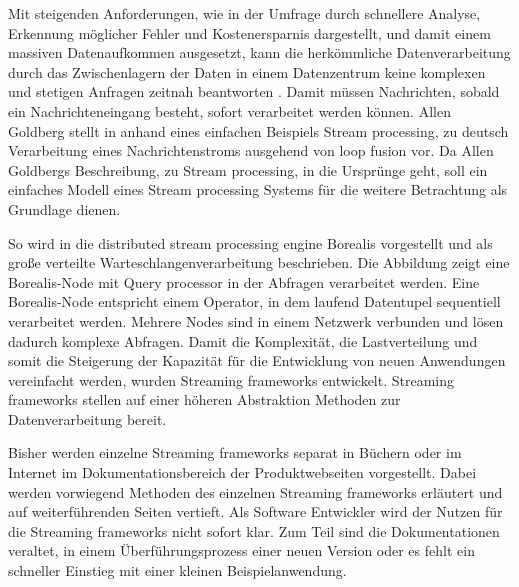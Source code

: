 Mit steigenden Anforderungen, wie in der Umfrage  durch schnellere Analyse, Erkennung möglicher Fehler und Kostenersparnis dargestellt, und damit einem massiven Datenaufkommen ausgesetzt, kann die herkömmliche Datenverarbeitung  durch das Zwischenlagern der Daten in einem Datenzentrum keine komplexen und stetigen Anfragen zeitnah beantworten . Damit müssen Nachrichten, sobald ein Nachrichteneingang besteht, sofort verarbeitet werden können. Allen Goldberg stellt in  anhand eines einfachen Beispiels Stream processing, zu deutsch Verarbeitung eines Nachrichtenstroms ausgehend von loop fusion  vor. Da Allen Goldbergs Beschreibung, zu Stream processing, in die Ursprünge geht, soll ein einfaches Modell eines Stream processing Systems für die weitere Betrachtung als Grundlage dienen.

So wird in  die distributed stream processing engine Borealis vorgestellt und als große verteilte Warteschlangenverarbeitung beschrieben. Die Abbildung  zeigt eine Borealis-Node mit Query processor in der Abfragen verarbeitet werden. Eine Borealis-Node entspricht einem Operator, in dem laufend Datentupel sequentiell verarbeitet werden. Mehrere Nodes sind in einem Netzwerk verbunden und lösen dadurch komplexe Abfragen. Damit die Komplexität, die Lastverteilung und somit die Steigerung der Kapazität für die Entwicklung von neuen Anwendungen vereinfacht werden, wurden Streaming frameworks entwickelt. Streaming frameworks stellen auf einer höheren Abstraktion Methoden zur Datenverarbeitung bereit. 

Bisher werden einzelne Streaming frameworks separat in Büchern oder im Internet im Dokumentationsbereich der Produktwebseiten vorgestellt. Dabei werden vorwiegend Methoden des einzelnen Streaming frameworks erläutert und auf weiterführenden Seiten vertieft. Als Software Entwickler wird der Nutzen für die Streaming frameworks nicht sofort klar. Zum Teil sind die Dokumentationen veraltet, in einem Überführungsprozess einer neuen Version oder es fehlt ein schneller Einstieg mit einer kleinen Beispielanwendung.

